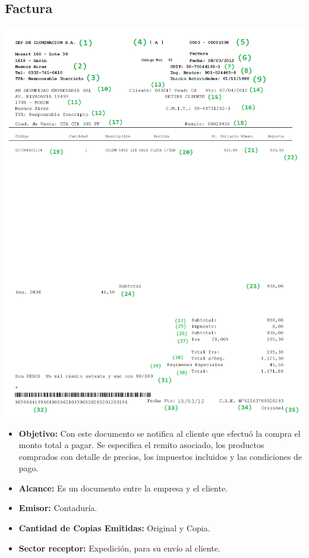 \subsection{Factura}
\begin{center}
 \includegraphics[scale=0.85,keepaspectratio=true]{./Images/FormulariosIEP/Factura.png}
\end{center}
\begin{itemize}
  \item \textbf{Objetivo:} Con este documento se notifica al cliente que efectu\'o la compra el monto total a pagar. Se especifica el remito asociado, los productos comprados con detalle de precios, los impuestos incluidos y las condiciones de pago.
  \item \textbf{Alcance:} Es un documento entre la empresa y el cliente.
  \item \textbf{Emisor:} Contadur\'ia.
  \item \textbf{Cantidad de Copias Emitidas:} Original y Copia.
  \item \textbf{Sector receptor:} Expedici\'on, para su env\'io al cliente.
\end{itemize}
